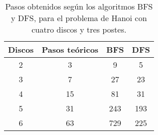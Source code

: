 \documentclass[a4paper,11pt]{article}
\begin{document}
\begin{table}[H]
    \centering
    \begin{tabular}{|c|c|c|c|}
        \hline
        \textbf{Discos} & \textbf{Pasos teóricos} & \textbf{BFS} & \textbf{DFS} \\ \hline
        2 & 3 & 9 & 5 \\ \hline
        3 & 7 & 27 & 23 \\ \hline
        4 & 15 & 81 & 31 \\ \hline
        5 & 31 & 243 & 193 \\ \hline
        6 & 63 & 729 & 225 \\ \hline
    \end{tabular}
    \caption{Pasos obtenidos según los algoritmos BFS y DFS, para el problema de Hanoi con cuatro discos y tres postes.}
    \label{tab:results}
\end{table}
\end{document}
